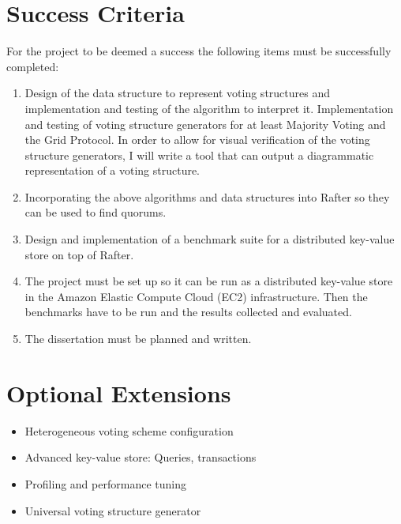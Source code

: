 \documentclass[12pt]{scrartcl}
\begin{document}
\section{Success Criteria%
  \label{success-criteria}%
}

For the project to be deemed a success the following items must be successfully completed:

\begin{enumerate}

\item Design of the data structure to represent voting structures and implementation and testing of the algorithm to interpret it. Implementation and testing of voting structure generators for at least Majority Voting and the Grid Protocol. In order to allow for visual verification of the voting structure generators, I will write a tool that can output a diagrammatic representation of a voting structure.

\item Incorporating the above algorithms and data structures into Rafter so they can be used to find quorums.

\item Design and implementation of a benchmark suite for a distributed key-value store on top of Rafter.

\item The project must be set up so it can be run as a distributed key-value store in the Amazon Elastic Compute Cloud (EC2) infrastructure. Then the benchmarks have to be run and the results collected and evaluated.

\item The dissertation must be planned and written.

\end{enumerate}

\section{Optional Extensions%
  \label{optional-extensions}%
}
%
\begin{itemize}

\item Heterogeneous voting scheme configuration

\item Advanced key-value store: Queries, transactions

\item Profiling and performance tuning

\item Universal voting structure generator

\end{itemize}
\end{document}
